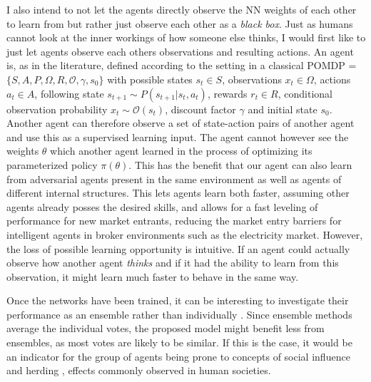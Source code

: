 \documentclass[12pt,a4paper]{article}
\begin{document}
I also intend to not let the agents directly observe the NN weights of each other to learn from but rather just observe each other as a \emph{black box}. Just as humans cannot look at the inner workings of how someone else thinks, I would first like to just let agents observe each others observations and resulting actions.
An agent is, as in the literature, defined according to the setting in a classical \ac{POMDP} =
$ \{ S, A, P, \Omega, R, \mathcal{O}, \gamma, s_0 \}$
with possible states $s_t \in S$,
observations $x_t \in \Omega$,
actions $a_t \in A$,
following state $s_{t+1} \sim P(s_{t+1} \vert s_t, a_t)$,
rewards $r_t \in R$,
conditional observation probability $x_t \sim \mathcal{O}(s_t)$,
discount factor $\gamma$ and
initial state $s_0$.
Another agent can therefore observe a set of state-action pairs of another agent and use this as a supervised learning input. The agent cannot however see the weights $\theta$ which another agent learned in the process of optimizing its parameterized policy $\pi(\theta)$.
This has the benefit that our agent can also learn from adversarial agents present in the same environment as well as agents of different internal structures. This lets agents learn both faster, assuming other agents already posses the desired skills, and allows for a fast leveling of performance for new market entrants, reducing the market entry barriers for intelligent agents in broker environments such as the electricity market.
However, the loss of possible learning opportunity is intuitive. If an agent could actually observe how another agent \emph{thinks} and if it had the ability to learn from this observation, it might learn much faster to behave in the same way.


Once the networks have been trained, it can be interesting to investigate their performance as an ensemble rather than individually \cite{opitz1999popular}. Since ensemble methods average the individual votes, the proposed model might benefit less from ensembles, as most votes are likely to be similar. If this is the case, it would be an indicator for the group of agents being prone to concepts of social influence and herding \cite{2015-45614-00120160201, hirshleifer1994blind}, effects commonly observed in human societies.
\end{document}

